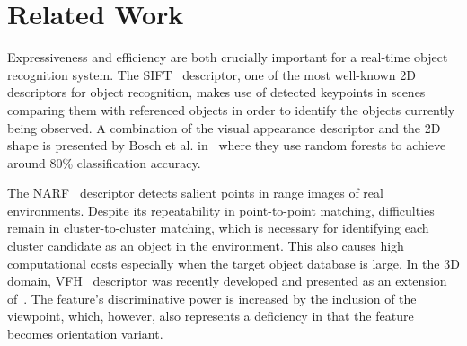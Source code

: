 \documentclass[a4paper, 10 pt, conference]{sty/ieeeconf}
\begin{document}
\section{Related Work}
\label{sec:rl}
Expressiveness and efficiency 
 are both crucially important for
a real-time object recognition system.%
The SIFT~\cite{lowe04distinctive} descriptor, one of the most well-known 2D
descriptors for object recognition, makes use of detected keypoints in
scenes comparing them with referenced objects in order to identify the
objects currently being observed. A combination of the visual appearance
descriptor and the 2D shape is presented by Bosch et al. in~\cite{Bosch07shape}
where they use random forests to achieve around 80\% classification 
accuracy. 

The NARF~\cite{steder10irosws} descriptor detects salient points in range images of
real environments. Despite its 
repeatability in point-to-point matching, difficulties remain in
cluster-to-cluster matching, which is necessary for identifying each cluster
candidate as an object in the environment. This also causes high computational costs
especially when the target object database is large. In the 3D domain, VFH~\cite{vfh} descriptor was recently developed and presented as an extension 
of~\cite{Rusu09ICRA}. The feature's discriminative power is increased
by the inclusion of the viewpoint, which, however, also represents
a deficiency in that the feature becomes orientation variant. 
\end{document}
